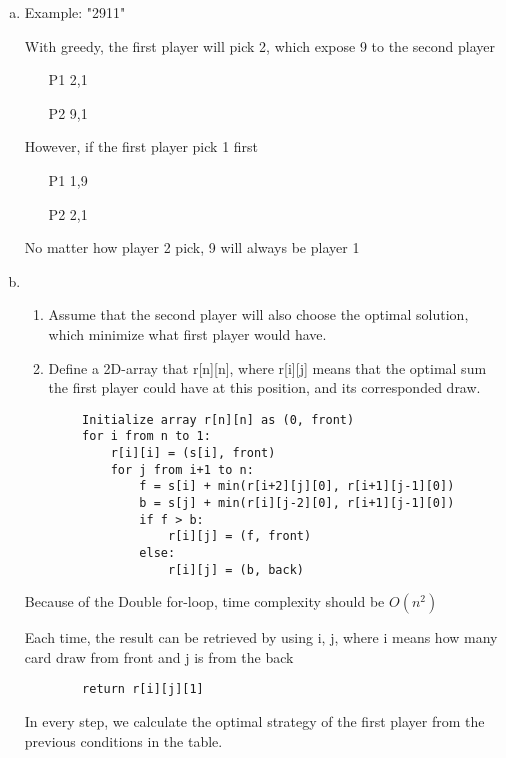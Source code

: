 \documentclass{article}
\def\math#1{$#1$}
\begin{document}
\begin{enumerate}[a)]
    \item Example: "2911"  
    
        With greedy, the first player will pick 2, which expose 9 to the second player
        \begin{itemize}
            \item [P1] 2,1
            \item [P2] 9,1
        \end{itemize}
        However, if the first player pick 1 first
        \begin{itemize}
            \item [P1] 1,9
            \item [P2] 2,1
        \end{itemize}
        No matter how player 2 pick, 9 will always be player 1
    \item 
    \begin{enumerate}
        \item Assume that the second player will also choose the optimal solution, which minimize what first player would have. 
        \item  Define a 2D-array that r[n][n], where r[i][j] means that the optimal sum the first player could have at this position, and its corresponded draw.
    \end{enumerate}
    
    \begin{verbatim}
        Initialize array r[n][n] as (0, front)
        for i from n to 1:
            r[i][i] = (s[i], front)
            for j from i+1 to n:
                f = s[i] + min(r[i+2][j][0], r[i+1][j-1][0])
                b = s[j] + min(r[i][j-2][0], r[i+1][j-1][0])
                if f > b:
                    r[i][j] = (f, front)
                else:
                    r[i][j] = (b, back)
    \end{verbatim}
    
    Because of the Double for-loop, time complexity should be \math{O(n^2)}
    
    Each time, the result can be retrieved by using i, j, where i means how many card draw from front and j is from the back
    \begin{verbatim}
        return r[i][j][1]
    \end{verbatim}
    
    In every step, we calculate the optimal strategy of the first player from the previous conditions in the table.
\end{enumerate}
\end{document}
